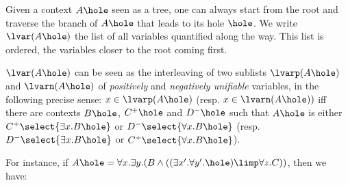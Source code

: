\begin{definition}
Given a context $A\hole$ seen as a tree, one can always start from
the root and traverse the branch of $A\hole$ that leads to its hole
$\hole$. We write $\lvar(A\hole)$ the list of all variables
quantified along the way. This list is ordered, the variables closer
to the root coming first.

$\lvar(A\hole)$ can be seen as the interleaving of two sublists
$\lvarp(A\hole)$ and $\lvarn(A\hole)$ of \emph{positively} and
\emph{negatively unifiable} variables, in the following precise sense:
$x \in \lvarp(A\hole)$ (resp. $x \in \lvarn(A\hole))$ iff there
are contexts $B\hole$, $C^+\hole$ and $D^-\hole$ such that
$A\hole$ is either $C^+\select{\exists x. B\hole}$ or
$D^-\select{\forall x. B\hole}$ (resp. $D^-\select{\exists x. B\hole}$
or $C^+\select{\forall x. B\hole}$).

For instance, if $A\hole = \forall x. \exists y. (B \land ((\exists x'. \forall
y'. \hole) \limp \forall z. C))$, then we have:


  

\end{definition}
